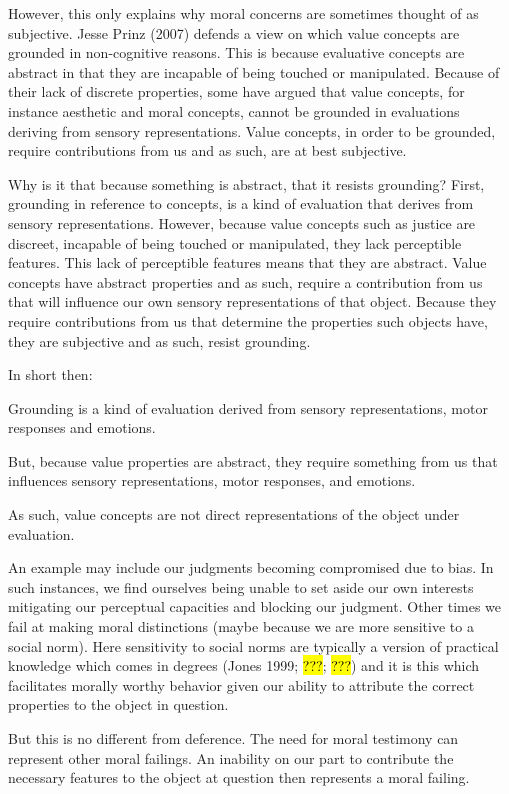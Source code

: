 \documentclass[
  letterpaper,
  DIV=11,
  numbers=noendperiod]{scrartcl}
\theoremstyle{remark}
\begin{document}
However, this only explains why moral concerns are sometimes thought of
as subjective. Jesse Prinz (2007) defends a view on which value concepts
are grounded in non-cognitive reasons. This is because evaluative
concepts are abstract in that they are incapable of being touched or
manipulated. Because of their lack of discrete properties, some have
argued that value concepts, for instance aesthetic and moral concepts,
cannot be grounded in evaluations deriving from sensory representations.
Value concepts, in order to be grounded, require contributions from us
and as such, are at best subjective.

Why is it that because something is abstract, that it resists grounding?
First, grounding in reference to concepts, is a kind of evaluation that
derives from sensory representations. However, because value concepts
such as justice are discreet, incapable of being touched or manipulated,
they lack perceptible features. This lack of perceptible features means
that they are abstract. Value concepts have abstract properties and as
such, require a contribution from us that will influence our own sensory
representations of that object. Because they require contributions from
us that determine the properties such objects have, they are subjective
and as such, resist grounding.

In short then:

Grounding is a kind of evaluation derived from sensory representations,
motor responses and emotions.

But, because value properties are abstract, they require something from
us that influences sensory representations, motor responses, and
emotions.

As such, value concepts are not direct representations of the object
under evaluation.

An example may include our judgments becoming compromised due to bias.
In such instances, we find ourselves being unable to set aside our own
interests mitigating our perceptual capacities and blocking our
judgment. Other times we fail at making moral distinctions (maybe
because we are more sensitive to a social norm). Here sensitivity to
social norms are typically a version of practical knowledge which comes
in degrees (Jones 1999; \hl{???}; \hl{???}) and it is this which
facilitates morally worthy behavior given our ability to attribute the
correct properties to the object in question.

But this is no different from deference. The need for moral testimony
can represent other moral failings. An inability on our part to
contribute the necessary features to the object at question then
represents a moral failing.
\end{document}
